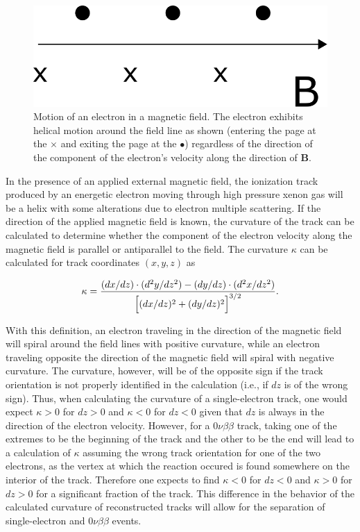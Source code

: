 \documentclass{JINST}
\begin{document}
\begin{figure}[!htb]
	\centering
	\includegraphics[scale=0.48]{fig/bfield_motion.pdf}
	\caption{\label{fig_bfieldmotion}Motion of an electron in a magnetic field.  The electron exhibits helical motion around the field line as shown (entering the page at the $\times$ and exiting the page at the $\bullet$) regardless of the direction of the component of the electron's velocity along the direction of $\mathbf{B}$.}
\end{figure}

In the presence of an applied external magnetic field, the ionization track produced by an energetic electron moving 
through high pressure xenon gas will be a helix with some alterations due to electron multiple scattering.  If the direction
of the applied magnetic field is known, the curvature of the track can be calculated to determine whether the component
of the electron velocity along the magnetic field is parallel or antiparallel to the field.  The curvature $\kappa$ can 
be calculated for track coordinates $(x,y,z)$ as

\begin{equation}\label{eqn_curv}
\kappa = \frac{(dx/dz)\cdot(d^2y/dz^2) - (dy/dz)\cdot(d^2x/dz^2)}{\Bigl[(dx/dz)^2 + (dy/dz)^2\Bigr]^{3/2}}.
\end{equation}

With this definition, an electron traveling in the direction of the magnetic field will spiral around the field lines with positive curvature, while an electron traveling opposite the direction of the magnetic field will spiral with negative curvature.  The curvature, however, will be of the opposite sign if the track orientation is not properly identified in the calculation (i.e., if $dz$ is of the wrong sign).  Thus, when calculating the curvature of a single-electron track, one would expect $\kappa > 0$ for $dz > 0$ and $\kappa < 0$ for $dz < 0$ given that $dz$ is always in the direction of the electron velocity.  However, for a $0\nu\beta\beta$ track, taking one of the extremes to be the beginning of the track and the other to be the end will lead to a calculation of $\kappa$ assuming the wrong track orientation for one of the two electrons, as the vertex at which the reaction occured is found somewhere on the interior of the track.  Therefore one expects to find $\kappa < 0$ for $dz < 0$ and $\kappa > 0$ for $dz > 0$ for a significant fraction of the track.  This difference in the behavior of the calculated curvature of reconstructed tracks will allow for the separation of single-electron and $0\nu\beta\beta$ events.
\end{document}
